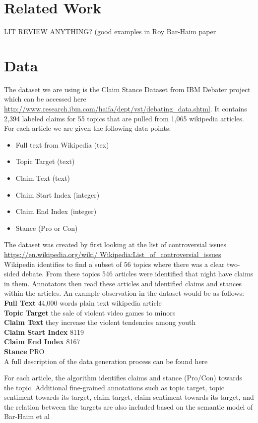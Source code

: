 \documentclass[11pt,a4paper]{article}
\begin{document}
\section{Related Work}
LIT REVIEW ANYTHING? (good examples in Roy Bar-Haim paper \\
\section{Data}
The dataset we are using is the Claim Stance Dataset from IBM Debater project which can be accessed here \url{http://www.research.ibm.com/haifa/dept/vst/debating_data.shtml}​.  It contains 2,394 labeled claims for 55 topics that are pulled from 1,065 wikipedia articles.  For each article we are given the following data points:

\begin{itemize}
\item Full text from Wikipedia (tex)
\item Topic Target (text)
\item Claim Text (text)
\item Claim Start Index (integer)
\item Claim End Index (integer)
\item Stance (Pro or Con)
\end{itemize}

The dataset was created by first looking at the list of controversial issues \url{https://en.wikipedia.org/wiki/
Wikipedia:List_of_controversial_issues} Wikipedia identifies to find a subset of 56 topics where there was a clear two-sided debate.  From these topics 546 articles were identified that night have claims in them.  Annotators then read these articles and identified claims and stances within the articles.  An example observation in the dataset would be as follows: \\
\textbf{Full Text} 44,000 words plain text wikipedia article\\
\textbf{Topic Target} the sale of violent video games to minors\\
\textbf{Claim Text} they increase the violent tendencies among youth\\
\textbf{Claim Start Index} 8119\\
\textbf{Claim End Index} 8167\\
\textbf{Stance} PRO\\
A full description of the data generation process can be found here \cite{toledo2016expert}

For each article, the algorithm identifies claims and stance (Pro/Con) towards the topic. Additional fine-grained annotations such as topic target, topic sentiment towards its target, claim target, claim sentiment towards its target, and the relation between the targets are also included based on the semantic model of Bar-Haim et al 
\end{document}

